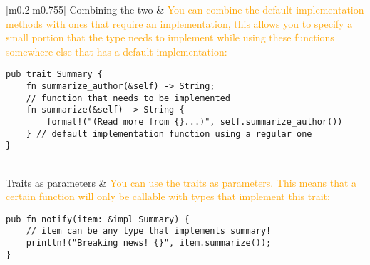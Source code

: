 \documentclass[main.tex,fontsize=8pt,paper=a4,paper=portrait,DIV=calc,]{scrartcl}
\begin{document}
\pagebreak
\begin{table}[ht!]
\begin{tabular}{|m{0.2\linewidth}|m{0.755\linewidth}|}
\hline
Combining the two & 
\textcolor{orange}{You can combine the default implementation methods with ones that require an implementation, this allows you to specify a small portion that the type needs to implement while using these functions somewhere else that has a default implementation:}\newline
\begin{lstlisting}
pub trait Summary {
    fn summarize_author(&self) -> String;
    // function that needs to be implemented
    fn summarize(&self) -> String {
        format!("(Read more from {}...)", self.summarize_author())
    } // default implementation function using a regular one
}
\end{lstlisting}\\
\hline
Traits as parameters & 
\textcolor{orange}{You can use the traits as parameters. This means that a certain function will only be callable with types that implement this trait:}\newline
\begin{lstlisting}
pub fn notify(item: &impl Summary) { 
    // item can be any type that implements summary!
    println!("Breaking news! {}", item.summarize());
}


\end{lstlisting}
\end{tabular}
\end{table}
\end{document}

